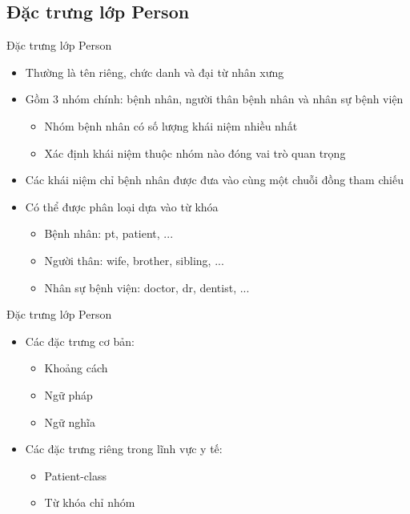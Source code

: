 \subsection{Đặc trưng lớp Person}
\begin{frame}{Đặc trưng lớp Person}
\putlogo
\begin{itemize}
	\item Thường là tên riêng, chức danh và đại từ nhân xưng
	\item Gồm 3 nhóm chính: bệnh nhân, người thân bệnh nhân và nhân sự bệnh viện
	\begin{itemize}
		\item Nhóm bệnh nhân có số lượng khái niệm nhiều nhất
		\item Xác định khái niệm thuộc nhóm nào đóng vai trò quan trọng
	\end{itemize}
	\item Các khái niệm chỉ bệnh nhân được đưa vào cùng một chuỗi đồng tham chiếu
	\item Có thể được phân loại dựa vào {\color{red} từ khóa}
	\begin{itemize}
		\item Bệnh nhân: pt, patient, ...
		\item Người thân: wife, brother, sibling, ...
		\item Nhân sự bệnh viện: doctor, dr, dentist, ...
	\end{itemize}
\end{itemize}
\end{frame}

\begin{frame}{Đặc trưng lớp Person}
\putlogo
\begin{itemize}
	\item Các đặc trưng {\color{red} cơ bản}:
	\begin{itemize}
		\item Khoảng cách
		\item Ngữ pháp
		\item Ngữ nghĩa
	\end{itemize}		
	\item Các đặc trưng riêng trong {\color{red} lĩnh vực y tế}:
	\begin{itemize}
		\item Patient-class
		\item Từ khóa chỉ nhóm
	\end{itemize}
\end{itemize}
\end{frame}

